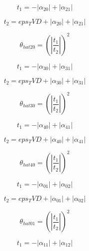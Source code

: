 \documentclass{article}
\begin{document}
\begin{dmath}t_{1} = - \left|{\alpha_{20}}\right| + \left|{\alpha_{21}}\right|\end{dmath}

\begin{dmath}t_{2} = eps_TVD + \left|{\alpha_{20}}\right| + \left|{\alpha_{21}}\right|\end{dmath}

\begin{dmath}\theta_{hat 20} = \left(\left|{\frac{t_{1}}{t_{2}}}\right| \right)^{2}\end{dmath}

\begin{dmath}t_{1} = - \left|{\alpha_{30}}\right| + \left|{\alpha_{31}}\right|\end{dmath}

\begin{dmath}t_{2} = eps_TVD + \left|{\alpha_{30}}\right| + \left|{\alpha_{31}}\right|\end{dmath}

\begin{dmath}\theta_{hat 30} = \left(\left|{\frac{t_{1}}{t_{2}}}\right| \right)^{2}\end{dmath}

\begin{dmath}t_{1} = - \left|{\alpha_{40}}\right| + \left|{\alpha_{41}}\right|\end{dmath}

\begin{dmath}t_{2} = eps_TVD + \left|{\alpha_{40}}\right| + \left|{\alpha_{41}}\right|\end{dmath}

\begin{dmath}\theta_{hat 40} = \left(\left|{\frac{t_{1}}{t_{2}}}\right| \right)^{2}\end{dmath}

\begin{dmath}t_{1} = - \left|{\alpha_{01}}\right| + \left|{\alpha_{02}}\right|\end{dmath}

\begin{dmath}t_{2} = eps_TVD + \left|{\alpha_{01}}\right| + \left|{\alpha_{02}}\right|\end{dmath}

\begin{dmath}\theta_{hat 01} = \left(\left|{\frac{t_{1}}{t_{2}}}\right| \right)^{2}\end{dmath}

\begin{dmath}t_{1} = - \left|{\alpha_{11}}\right| + \left|{\alpha_{12}}\right|\end{dmath}
\end{document}
